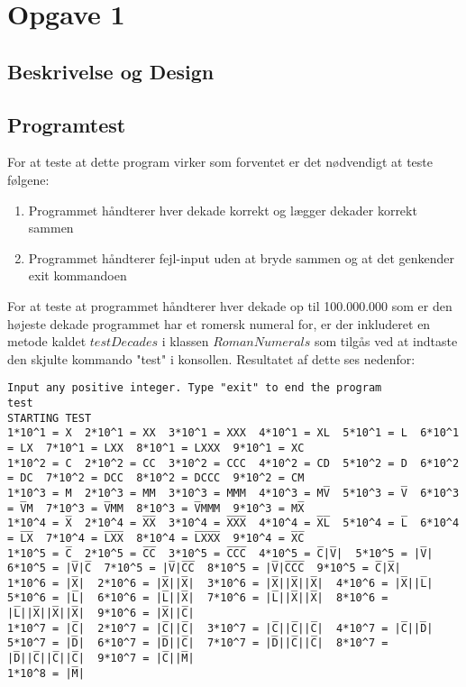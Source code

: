 \section{Opgave 1}
\subsection{Beskrivelse og Design}

\subsection{Programtest}
	For at teste at dette program virker som forventet er det nødvendigt at teste følgene:
 	\begin{enumerate}
 		\item Programmet håndterer hver dekade korrekt og lægger dekader korrekt sammen
 		\item Programmet håndterer fejl-input uden at bryde sammen og at det genkender exit kommandoen
 	\end{enumerate}
 	For at teste at programmet håndterer hver dekade op til 100.000.000 som er den højeste dekade programmet har et romersk numeral for, er der inkluderet en metode kaldet $testDecades$ i klassen $RomanNumerals$ som tilgås ved at indtaste den skjulte kommando "test" i konsollen. Resultatet af dette ses nedenfor:
	\begin{lstlisting}[caption=output fra kørsel af testDecades]
Input any positive integer. Type "exit" to end the program
test
STARTING TEST
1*10^1 = X  2*10^1 = XX  3*10^1 = XXX  4*10^1 = XL  5*10^1 = L  6*10^1 = LX  7*10^1 = LXX  8*10^1 = LXXX  9*10^1 = XC  
1*10^2 = C  2*10^2 = CC  3*10^2 = CCC  4*10^2 = CD  5*10^2 = D  6*10^2 = DC  7*10^2 = DCC  8*10^2 = DCCC  9*10^2 = CM  
1*10^3 = M  2*10^3 = MM  3*10^3 = MMM  4*10^3 = MV̅  5*10^3 = V̅  6*10^3 = V̅M  7*10^3 = V̅MM  8*10^3 = V̅MMM  9*10^3 = MX̅  
1*10^4 = X̅  2*10^4 = X̅X̅  3*10^4 = X̅X̅X̅  4*10^4 = X̅L̅  5*10^4 = L̅  6*10^4 = L̅X̅  7*10^4 = L̅X̅X̅  8*10^4 = L̅X̅X̅X̅  9*10^4 = X̅C̅  
1*10^5 = C̅  2*10^5 = C̅C̅  3*10^5 = C̅C̅C̅  4*10^5 = C̅|V̅|  5*10^5 = |V̅|  6*10^5 = |V̅|C̅  7*10^5 = |V̅|C̅C̅  8*10^5 = |V̅|C̅C̅C̅  9*10^5 = C̅|X̅|  
1*10^6 = |X̅|  2*10^6 = |X̅||X̅|  3*10^6 = |X̅||X̅||X̅|  4*10^6 = |X̅||L̅|  5*10^6 = |L̅|  6*10^6 = |L̅||X̅|  7*10^6 = |L̅||X̅||X̅|  8*10^6 = |L̅||X̅||X̅||X̅|  9*10^6 = |X̅||C̅|  
1*10^7 = |C̅|  2*10^7 = |C̅||C̅|  3*10^7 = |C̅||C̅||C̅|  4*10^7 = |C̅||D̅|  5*10^7 = |D̅|  6*10^7 = |D̅||C̅|  7*10^7 = |D̅||C̅||C̅|  8*10^7 = |D̅||C̅||C̅||C̅|  9*10^7 = |C̅||M̅|  
1*10^8 = |M̅|  
	\end{lstlisting}
